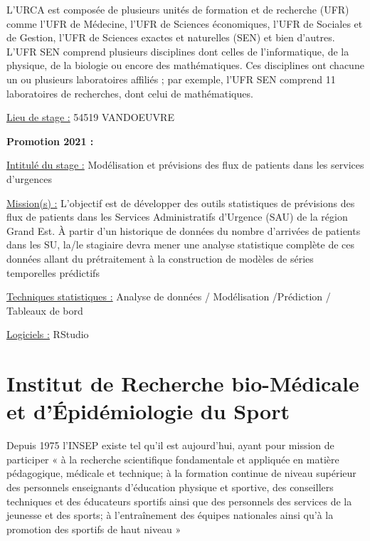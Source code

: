 \documentclass[
  letterpaper,
  DIV=11,
  numbers=noendperiod]{scrreprt}
\begin{document}
L'URCA est composée de plusieurs unités de formation et de recherche
(UFR) comme l'UFR de Médecine, l'UFR de Sciences économiques, l'UFR de
Sociales et de Gestion, l'UFR de Sciences exactes et naturelles (SEN) et
bien d'autres. L'UFR SEN comprend plusieurs disciplines dont celles de
l'informatique, de la physique, de la biologie ou encore des
mathématiques. Ces disciplines ont chacune un ou plusieurs laboratoires
affiliés ; par exemple, l'UFR SEN comprend 11 laboratoires de
recherches, dont celui de mathématiques.

\uline{Lieu de stage :} 54519 VANDOEUVRE

\textbf{Promotion 2021 :}

\uline{Intitulé du stage :} Modélisation et prévisions des flux de
patients dans les services d'urgences

\uline{Mission(s) :} L'objectif est de développer des outils
statistiques de prévisions des flux de patients dans les Services
Administratifs d'Urgence (SAU) de la région Grand Est. À partir d'un
historique de données du nombre d'arrivées de patients dans les SU,
la/le stagiaire devra mener une analyse statistique complète de ces
données allant du prétraitement à la construction de modèles de séries
temporelles prédictifs

\uline{Techniques statistiques :} Analyse de données / Modélisation
/Prédiction / Tableaux de bord

\uline{Logiciels :} RStudio

\hypertarget{institut-de-recherche-bio-muxe9dicale-et-duxe9piduxe9miologie-du-sport}{%
\section{\texorpdfstring{\textbf{Institut de Recherche bio-Médicale et
d'Épidémiologie du
Sport}}{Institut de Recherche bio-Médicale et d'Épidémiologie du Sport}}\label{institut-de-recherche-bio-muxe9dicale-et-duxe9piduxe9miologie-du-sport}}

Depuis 1975 l'INSEP existe tel qu'il est aujourd'hui, ayant pour mission
de participer « à la recherche scientifique fondamentale et appliquée en
matière pédagogique, médicale et technique; à la formation continue de
niveau supérieur des personnels enseignants d'éducation physique et
sportive, des conseillers techniques et des éducateurs sportifs ainsi
que des personnels des services de la jeunesse et des sports; à
l'entraînement des équipes nationales ainsi qu'à la promotion des
sportifs de haut niveau »
\end{document}
